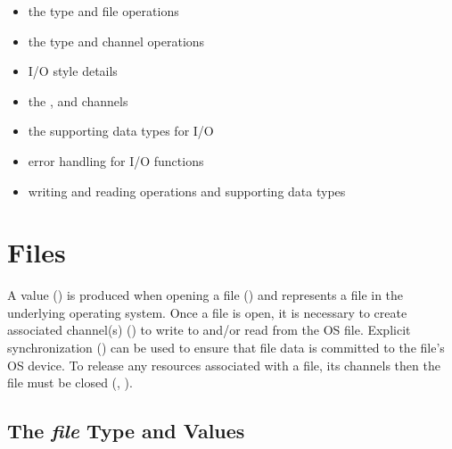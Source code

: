 \begin{itemize}

\item the  type and file operations

\item the  type and channel operations

\item I/O style details

\item the ,  and  channels

\item the supporting data types for I/O

\item error handling for I/O functions

\item writing and reading operations and supporting data types

\end{itemize}




\section{Files}
\label{IO_files}

A  value ()
is produced when opening a file ()
and represents a file in the underlying operating system.
%
Once a file is open, it is necessary to create associated channel(s)
() to write to and/or read from the OS file.
%
Explicit synchronization () can be used to ensure
that file data is committed to the file's OS device.
%
To release any resources associated with a file,
its channels then the file must be closed
(, ).


\subsection{The {\em file} Type and Values}
\label{IO_file_type}

